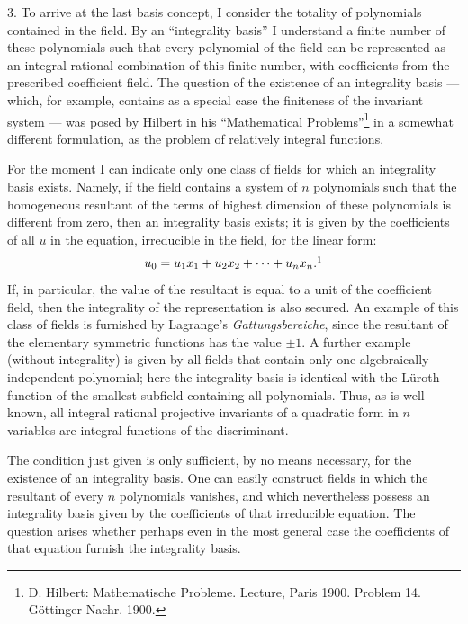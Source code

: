 \documentclass[11pt]{article}
\begin{document}
3. To arrive at the last basis concept, I consider the totality of polynomials contained in the field. By an ``integrality basis'' I understand a finite number of these polynomials such that every polynomial of the field can be represented as an integral rational combination of this finite number, with coefficients from the prescribed coefficient field. The question of the existence of an integrality basis --- which, for example, contains as a special case the finiteness of the invariant system --- was posed by Hilbert in his ``Mathematical Problems''\footnote{D. Hilbert: Mathematische Probleme. Lecture, Paris 1900. Problem 14. Göttinger Nachr. 1900.} in a somewhat different formulation, as the problem of relatively integral functions.

For the moment I can indicate only one class of fields for which an integrality basis exists. Namely, if the field contains a system of $n$ polynomials such that the homogeneous resultant of the terms of highest dimension of these polynomials is different from zero, then an integrality basis exists; it is given by the coefficients of all $u$ in the equation, irreducible in the field, for the linear form:
\[
  u_0=u_1x_1+u_2x_2+\cdots+u_nx_n.\footnotemark
\]
If, in particular, the value of the resultant is equal to a unit of the coefficient field, then the integrality of the representation is also secured. An example of this class of fields is furnished by Lagrange's \emph{Gattungsbereiche}, since the resultant of the elementary symmetric functions has the value $\pm 1$. A further example (without integrality) is given by all fields that contain only one algebraically independent polynomial; here the integrality basis is identical with the Lüroth function of the smallest subfield containing all polynomials. Thus, as is well known, all integral rational projective invariants of a quadratic form in $n$ variables are integral functions of the discriminant.

The condition just given is only sufficient, by no means necessary, for the existence of an integrality basis. One can easily construct fields in which the resultant of every $n$ polynomials vanishes, and which nevertheless possess an integrality basis given by the coefficients of that irreducible equation. The question arises whether perhaps even in the most general case the coefficients of that equation furnish the integrality basis.
\end{document}
